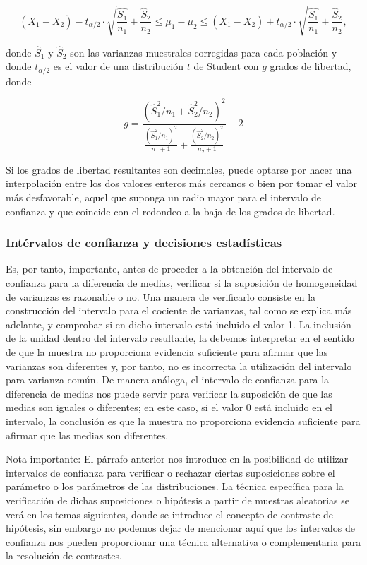 \documentclass[
]{article}
\begin{document}
\[
\left(\bar{X}_{1}-\bar{X}_{2}\right)-t_{\alpha / 2} \cdot \sqrt{\frac{\hat{S_{1}}}{n_{1}}+\frac{\hat{S}_{2}}{n_{2}}} \leq \mu_{1}-\mu_{2} \leq\left(\bar{X}_{1}-\bar{X}_{2}\right)+t_{\alpha / 2} \cdot \sqrt{\frac{\hat{S_{1}}}{n_{1}}+\frac{\hat{S}_{2}}{n_{2}}},
\]

donde \(\hat{S}_{1}\) y \(\hat{S}_{2}\) son las varianzas muestrales corregidas para cada población y donde \(t_{\alpha / 2}\) es el valor de una distribución \(t\) de Student con \(g\) grados de libertad, donde

\[
g=\frac{\left(\hat{S}_{1}^{2} / n_{1}+\hat{S}_{2}^{2} / n_{2}\right)^{2}}{\frac{\left(\hat{S}_{1}^{2} / n_{1}\right)^{2}}{n_{1}+1}+\frac{\left(\hat{S}_{2}^{2} / n_{2}\right)^{2}}{n_{2}+1}}-2
\]

Si los grados de libertad resultantes son decimales, puede optarse por hacer una interpolación entre los dos valores enteros más cercanos o bien por tomar el valor más desfavorable, aquel que suponga un radio mayor para el intervalo de confianza y que coincide con el redondeo a la baja de los grados de libertad.

\subsubsection{Intérvalos de confianza y decisiones estadísticas}\label{intuxe9rvalos-de-confianza-y-decisiones-estaduxedsticas}

Es, por tanto, importante, antes de proceder a la obtención del intervalo de confianza para la diferencia de medias, verificar si la suposición de homogeneidad de varianzas es razonable o no. Una manera de verificarlo consiste en la construcción del intervalo para el cociente de varianzas, tal como se explica más adelante, y comprobar si en dicho intervalo está incluido el valor 1. La inclusión de la unidad dentro del intervalo resultante, la debemos interpretar en el sentido de que la muestra no proporciona evidencia suficiente para afirmar que las varianzas son diferentes y, por tanto, no es incorrecta la utilización del intervalo para varianza común. De manera análoga, el intervalo de confianza para la diferencia de medias nos puede servir para verificar la suposición de que las medias son iguales o diferentes; en este caso, si el valor 0 está incluido en el intervalo, la conclusión es que la muestra no proporciona evidencia suficiente para afirmar que las medias son diferentes.

Nota importante: El párrafo anterior nos introduce en la posibilidad de utilizar intervalos de confianza para verificar o rechazar ciertas suposiciones sobre el parámetro o los parámetros de las distribuciones. La técnica específica para la verificación de dichas suposiciones o hipótesis a partir de muestras aleatorias se verá en los temas siguientes, donde se introduce el concepto de contraste de hipótesis, sin embargo no podemos dejar de mencionar aquí que los intervalos de confianza nos pueden proporcionar una técnica alternativa o complementaria para la resolución de contrastes.
\end{document}
